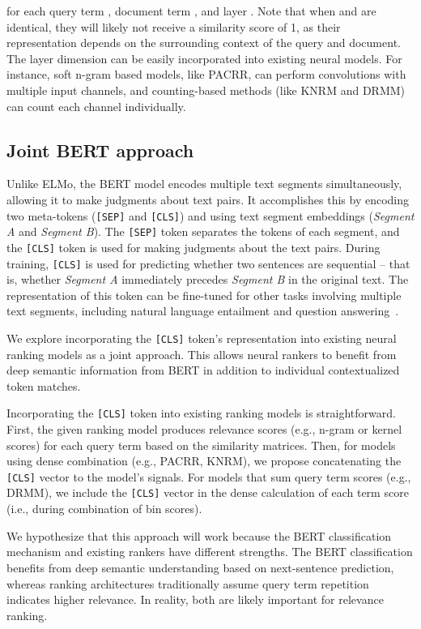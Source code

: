 \documentclass[sigconf]{acmart}
\begin{document}
for each query term , document term , and layer . Note that when  and  are identical, they will likely not receive a similarity score of 1, as their representation depends on the surrounding context of the query and document. The layer dimension can be easily incorporated into existing neural models. For instance, soft n-gram based models, like PACRR, can perform convolutions with multiple input channels, and counting-based methods (like KNRM and DRMM) can count each channel individually.

\subsection{Joint BERT approach}

Unlike ELMo, the BERT model encodes multiple text segments simultaneously, allowing it to make judgments about text pairs. It accomplishes this by encoding two meta-tokens (\texttt{[SEP]} and \texttt{[CLS]}) and using text segment embeddings (\textit{Segment A} and \textit{Segment B}). The \texttt{[SEP]} token separates the tokens of each segment, and the \texttt{[CLS]} token is used for making judgments about the text pairs. During training, \texttt{[CLS]} is used for predicting whether two sentences are sequential -- that is, whether \textit{Segment A} immediately precedes \textit{Segment B} in the original text. The representation of this token can be fine-tuned for other tasks involving multiple text segments, including natural language entailment and question answering~\cite{2019EndtoEndOQ}.

We explore incorporating the \texttt{[CLS]} token's representation into existing neural ranking models as a joint approach. This allows neural rankers to benefit from deep semantic information from BERT in addition to individual contextualized token matches.

Incorporating the \texttt{[CLS]} token into existing ranking models is straightforward. First, the given ranking model produces relevance scores (e.g., n-gram or kernel scores) for each query term based on the similarity matrices. Then, for models using dense combination (e.g., PACRR, KNRM), we propose concatenating the \texttt{[CLS]} vector to the model's signals. For models that sum query term scores (e.g., DRMM), we include the \texttt{[CLS]} vector in the dense calculation of each term score (i.e., during combination of bin scores).

We hypothesize that this approach will work because the BERT classification mechanism and existing rankers have different strengths. The BERT classification benefits from deep semantic understanding based on next-sentence prediction, whereas ranking architectures traditionally assume query term repetition indicates higher relevance. In reality, both are likely important for relevance ranking.
\end{document}
